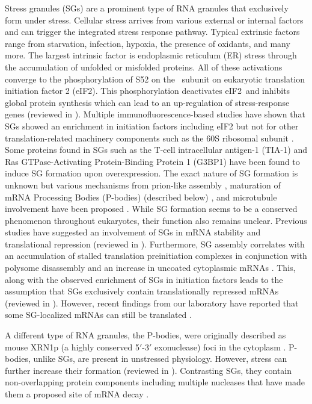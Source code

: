Stress granules (SGs) are a prominent type of RNA granules that exclusively form under stress.
Cellular stress arrives from various external or internal factors and can trigger the integrated stress response pathway.
Typical extrinsic factors range from starvation, infection, hypoxia, the presence of oxidants, and many more.
The largest intrinsic factor is endoplasmic reticulum (ER) stress through the accumulation of unfolded or misfolded proteins.
All of these activations converge to the phosphorylation of S52 on the \textalpha\ subunit on eukaryotic translation initiation factor 2 (eIF2\textalpha).
This phosphorylation deactivates eIF2\textalpha\ and inhibits global protein synthesis which can lead to an up-regulation of stress-response genes (reviewed in \cite{pakoszebrucka_integrated_2016}).
Multiple immunofluorescence-based studies have shown that SGs showed an enrichment in initiation factors including eIF2 but not for other translation-related machinery components such as the 60S ribosomal subunit \cite{kimball_mammalian_2003}.
Some proteins found in SGs such as the T-cell intracellular antigen-1 (TIA-1) \cite{kedersha_rna-binding_1999} and Ras GTPase-Activating Protein-Binding Protein 1 (G3BP1) \cite{tourriere_rasgap-associated_2003} have been found to induce SG formation upon overexpression.
The exact nature of SG formation is unknown but various mechanisms from prion-like assembly \cite{gilks_stress_2004, shattuck_prion-like_2019}, maturation of mRNA Processing Bodies (P-bodies) (described below) \cite{buchan_p_2008}, and microtubule involvement have been proposed \cite{ivanov_disruption_2003}.
While SG formation seems to be a conserved phenomenon throughout eukaryotes, their function also remains unclear.
Previous studies have suggested an involvement of SGs in mRNA stability and translational repression (reviewed in \cite{buchan_eukaryotic_2009}).
Furthermore, SG assembly correlates with an accumulation of stalled translation preinitiation complexes in conjunction with polysome disassembly and an increase in uncoated cytoplasmic mRNAs \cite{panas_mechanistic_2016}.
This, along with the observed enrichment of SGs in initiation factors leads to the assumption that SGs exclusively contain translationally repressed mRNAs (reviewed in \cite{thomas_rna_2011}).
However, recent findings from our laboratory have reported that some SG-localized mRNAs can still be translated \cite{mateju_single-molecule_2020}.

A different type of RNA granules, the P-bodies, were originally described as mouse XRN1p (a highly conserved 5$'$-3$'$ exonuclease) foci in the cytoplasm \cite{bashkirov_mouse_1997}.
P-bodies, unlike SGs, are present in unstressed physiology.
However, stress can further increase their formation (reviewed in \cite{parker_p_2007}).
Contrasting SGs, they contain non-overlapping protein components including multiple nucleases that have made them a proposed site of mRNA decay \cite{sheth_decapping_2003}.

